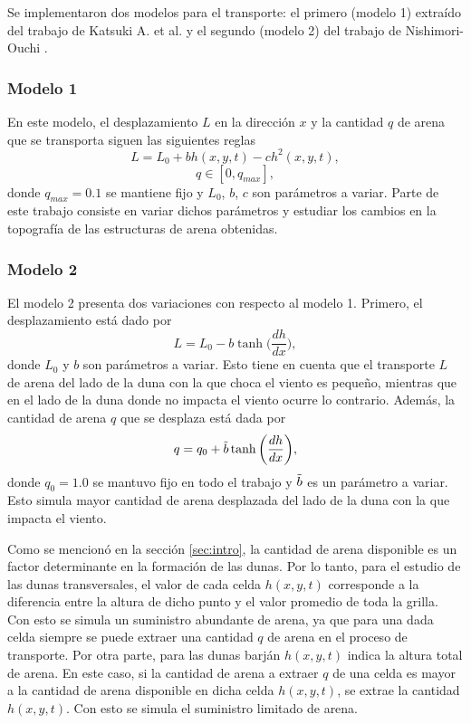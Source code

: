 \documentclass[11pt,twocolumn,twoside]{opticajnl}
\begin{document}
Se implementaron dos modelos para el transporte: el primero (modelo 1) extraído del trabajo de Katsuki A. et al. \cite{katsuki_cellular_2011} y el segundo (modelo 2) del trabajo de Nishimori-Ouchi \cite{nishimori_formation_1993}. 

\subsubsection{Modelo 1}

En este modelo, el desplazamiento $L$ en la dirección $x$ y la cantidad $q$ de arena que se transporta siguen las siguientes reglas
\begin{equation}
    L = L_0 + bh(x,y,t) - ch^2(x,y,t),
    \label{ec:Lmodelo1}
\end{equation}
\begin{equation}
    q \in [0,q_{max}],
\end{equation}
donde $q_{max} = 0.1$ se mantiene fijo y $L_0$, $b$, $c$ son parámetros a variar. Parte de este trabajo consiste en variar dichos parámetros y estudiar los cambios en la topografía de las estructuras de arena obtenidas. 

\subsubsection{Modelo 2}

El modelo 2 presenta dos variaciones con respecto al modelo 1. Primero, el desplazamiento está dado por 
\begin{equation}
    L = L_0 - b \tanh{ \biggr( \frac{dh}{dx}  \biggr) },
    \label{ec:Lmodelo2}
\end{equation}
donde $L_0$ y $b$ son parámetros a variar. Esto tiene en cuenta que el transporte $L$ de arena del lado de la duna con la que choca el viento es pequeño, mientras que en el lado de la duna donde no impacta el viento ocurre lo contrario. 
Además, la cantidad de arena $q$ que se desplaza está dada por 
\begin{equation}
q = q_0 + \Tilde{b} \tanh{ \biggr( \frac{dh}{dx} \biggr) },
\label{ec:qmodelo2}
\end{equation}
donde $q_0=1.0$ se mantuvo fijo en todo el trabajo y $\Tilde{b}$ es un parámetro a variar. Esto simula mayor cantidad de arena desplazada del lado de la duna con la que impacta el viento. 

Como se mencionó en la sección \ref{sec:intro}, la cantidad de arena disponible es un factor determinante en la formación de las dunas. Por lo tanto, para el estudio de las dunas transversales, el valor de cada celda $h(x,y,t)$ corresponde a la diferencia entre la altura de dicho punto y el valor promedio de toda la grilla. Con esto se simula un suministro abundante de arena, ya que para una dada celda siempre se puede extraer una cantidad $q$ de arena en el proceso de transporte. Por otra parte, para las dunas barján $h(x,y,t)$ indica la altura total de arena. En este caso, si la cantidad de arena a extraer $q$ de una celda es mayor a la cantidad de arena disponible en dicha celda $h(x,y,t)$, se extrae la cantidad $h(x,y,t)$. Con esto se simula el suministro limitado de arena. 
\end{document}
